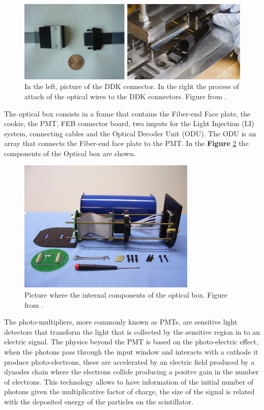 \begin{figure}[!htb]
    \centering
    \includegraphics{Figures/Chapter2/OpticCablesConnectors.jpg}
    \caption{In the left, picture of the DDK connector. In the right the process of attach of the optical wires to the DDK connectors. Figure from \cite{ALIAGA2014130}.}
    \label{fig:MnvExp:MnvDetector:DDKConnector}
\end{figure}

The optical box consists in a frame that contains the Fiber-end Face plate, the cookie, the PMT, FEB connector board, two imputs for the Light Injection (LI) system, connecting cables and the Optical Decoder Unit (ODU). The ODU is an array that connects the Fiber-end face plate to the PMT. In the \textbf{Figure} \ref{fig:MnvExp:MnvDetector:OpticalBox} the components of the Optical box are shown. 

\begin{figure}[!htb]
    \centering
    \includegraphics{Figures/Chapter2/OpticaBox.jpg}
    \caption{Picture where the internal components of the optical box. Figure from \cite{ALIAGA2014130}.}
    \label{fig:MnvExp:MnvDetector:OpticalBox}
\end{figure}

The photo-multipliers, more commonly known as PMTs, are sensitive light detectors that transform the light that is collected by the sensitive region in to an electric signal. The physics beyond the PMT is based on the photo-electric effect, when the photons pass through the input window and interacts with a  cathode it produce photo-electrons, these are accelerated by an electric field produced by a dynodes chain where the electrons collide producing a positve gain in the number of electrons. This technology allows to have information of the initial number of photons given the multiplicative factor of charge, the size of the signal is related with the deposited energy of the particles on the scintillator. 

